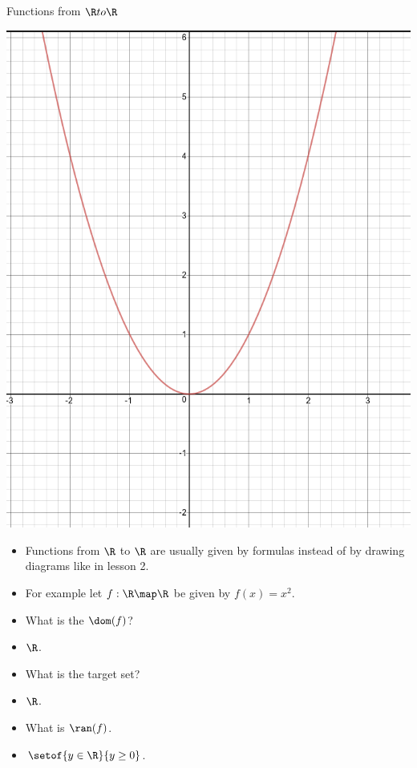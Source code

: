 \documentclass{beamer}
\begin{document}
\begin{frame}{Functions from $\R to \R$}

\includegraphics[scale=0.1]{parabola}

\begin{itemize}
\item Functions from $\R$ to $\R$ are usually given by formulas instead of
by drawing diagrams like in lesson 2.
\item For example let $f:\R\map\R$ be given by $f(x) = x^2$.
\item What is the $\dom(f)$?
\item $\R$.
\item What is the target set?
\item $\R$.
\item What is $\ran(f)$.
\item $\setof{y\in\R}{y\geq 0}$.
\end{itemize}

\end{frame}
\end{document}
